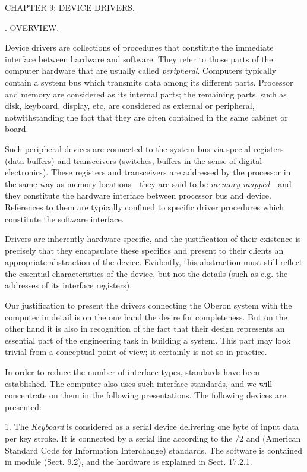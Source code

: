 \beginchapter CHAPTER 9: DEVICE DRIVERS.

. OVERVIEW.

Device drivers are collections of procedures that constitute the immediate interface between hardware and software. They refer to those parts of the computer hardware that are usually called \emph{peripheral}. Computers typically contain a system bus which transmits data among its different parts. Processor and memory are considered as its internal parts; the remaining parts, such as disk, keyboard, display, etc, are considered as external or peripheral, notwithstanding the fact that they are often contained in the same cabinet or board.

Such peripheral devices are connected to the system bus via special registers (data buffers) and transceivers (switches, buffers in the sense of digital electronics). These registers and transceivers are addressed by the processor in the same way as memory locations---they are said to be \emph{memory-mapped}---and they constitute the hardware interface between processor bus and device. References to them are typically confined to specific driver procedures which constitute the software interface.

Drivers are inherently hardware specific, and the justification of their existence is precisely that they encapsulate these specifics and present to their clients an appropriate abstraction of the device. Evidently, this abstraction must still reflect the essential characteristics of the device, but not the details (such as e.g. the addresses of its interface registers).

Our justification to present the drivers connecting the Oberon system with the \RISC computer in detail is on the one hand the desire for completeness. But on the other hand it is also in recognition of the fact that their design represents an essential part of the engineering task in building a system. This part may look trivial from a conceptual point of view; it certainly is not so in practice.

In order to reduce the number of interface types, standards have been established. The \RISC computer also uses such interface standards, and we will concentrate on them in the following presentations. The following devices are presented:

1. The \emph{Keyboard} is considered as a serial device delivering one byte of input data per key stroke. It is connected by a serial line according to the /2 and \ASCII (American Standard Code for Information Interchange) standards. The software is contained in module  (Sect. 9.2), and the hardware is explained in Sect. 17.2.1.

